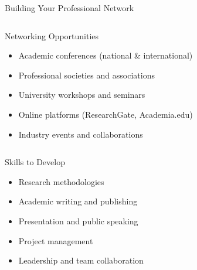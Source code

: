 \documentclass[10pt]{beamer}
\begin{document}
\begin{frame}[fragile]{Building Your Professional Network}
\begin{columns}[T]
    \begin{column}{0.6\textwidth}
        \alert{Networking Opportunities}
        \begin{itemize}
            \item Academic conferences (national \& international)
            \item Professional societies and associations
            \item University workshops and seminars
            \item Online platforms (ResearchGate, Academia.edu)
            \item Industry events and collaborations
        \end{itemize}
    \end{column}
    \begin{column}{0.4\textwidth}
    \end{column}
\end{columns}

\vspace{0.3cm}
\alert{Skills to Develop}
\begin{itemize}
    \item Research methodologies
    \item Academic writing and publishing
    \item Presentation and public speaking
    \item Project management
    \item Leadership and team collaboration
\end{itemize}
\end{frame}
\end{document}
